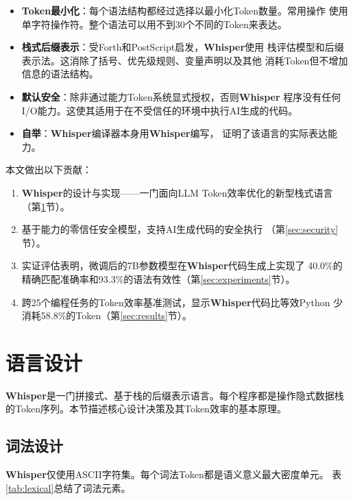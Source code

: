 \documentclass[11pt,a4paper]{ctexart}
\begin{document}
\begin{itemize}
\item \textbf{Token最小化}：每个语法结构都经过选择以最小化Token数量。常用操作
  使用单字符操作符。整个语法可以用不到30个不同的Token来表达。
\item \textbf{栈式后缀表示}：受Forth和PostScript启发，\textbf{Whisper}使用
  栈评估模型和后缀表示法。这消除了括号、优先级规则、变量声明以及其他
  消耗Token但不增加信息的语法结构。
\item \textbf{默认安全}：除非通过能力Token系统显式授权，否则\textbf{Whisper}
  程序没有任何I/O能力。这使其适用于在不受信任的环境中执行AI生成的代码。
\item \textbf{自举}：\textbf{Whisper}编译器本身用\textbf{Whisper}编写，
  证明了该语言的实际表达能力。
\end{itemize}

本文做出以下贡献：

\begin{enumerate}
\item \textbf{Whisper}的设计与实现——一门面向LLM Token效率优化的新型栈式语言
  （第\ref{sec:design}节）。
\item 基于能力的零信任安全模型，支持AI生成代码的安全执行
  （第\ref{sec:security}节）。
\item 实证评估表明，微调后的7B参数模型在\textbf{Whisper}代码生成上实现了
  40.0\%的精确匹配准确率和93.3\%的语法有效性（第\ref{sec:experiments}节）。
\item 跨25个编程任务的Token效率基准测试，显示\textbf{Whisper}代码比等效Python
  少消耗58.8\%的Token（第\ref{sec:results}节）。
\end{enumerate}

\section{语言设计}
\label{sec:design}

\textbf{Whisper}是一门拼接式、基于栈的后缀表示语言。每个程序都是操作隐式数据栈
的Token序列。本节描述核心设计决策及其Token效率的基本原理。

\subsection{词法设计}

\textbf{Whisper}仅使用ASCII字符集。每个词法Token都是语义意义最大密度单元。
表\ref{tab:lexical}总结了词法元素。
\end{document}
